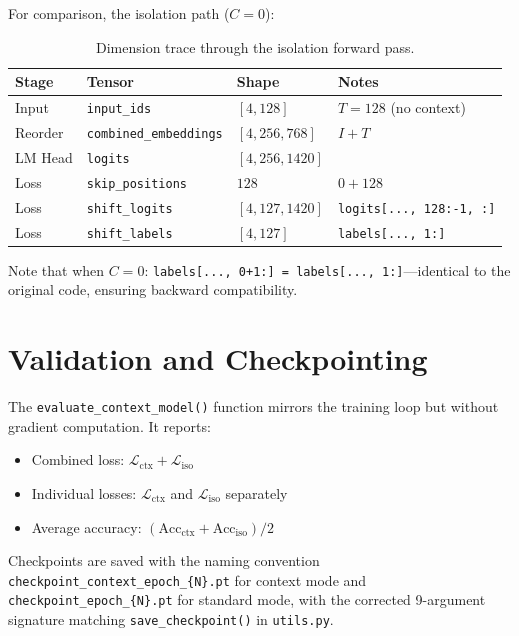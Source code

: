 \documentclass[11pt, a4paper]{report}
\begin{document}
For comparison, the isolation path ($C{=}0$):

\begin{table}[h]
\centering
\caption{Dimension trace through the isolation forward pass.}
\label{tab:dim-trace-iso}
\small
\begin{tabular}{llll}
\toprule
\textbf{Stage} & \textbf{Tensor} & \textbf{Shape} & \textbf{Notes} \\
\midrule
Input & \texttt{input\_ids} & $[4, 128]$ & $T{=}128$ (no context) \\
Reorder & \texttt{combined\_embeddings} & $[4, 256, 768]$ & $I{+}T$ \\
LM Head & \texttt{logits} & $[4, 256, 1420]$ & \\
\midrule
Loss & \texttt{skip\_positions} & $128$ & $0{+}128$ \\
Loss & \texttt{shift\_logits} & $[4, 127, 1420]$ & \texttt{logits[..., 128:-1, :]} \\
Loss & \texttt{shift\_labels} & $[4, 127]$ & \texttt{labels[..., 1:]} \\
\bottomrule
\end{tabular}
\end{table}

Note that when $C{=}0$: \texttt{labels[..., 0+1:] = labels[..., 1:]}---identical to the original code, ensuring backward compatibility.


\section{Validation and Checkpointing}
\label{sec:validation}

The \texttt{evaluate\_context\_model()} function mirrors the training loop but without gradient computation. It reports:
\begin{itemize}[leftmargin=2em]
  \item Combined loss: $\mathcal{L}_{\mathrm{ctx}} + \mathcal{L}_{\mathrm{iso}}$
  \item Individual losses: $\mathcal{L}_{\mathrm{ctx}}$ and $\mathcal{L}_{\mathrm{iso}}$ separately
  \item Average accuracy: $(\mathrm{Acc}_{\mathrm{ctx}} + \mathrm{Acc}_{\mathrm{iso}}) / 2$
\end{itemize}

Checkpoints are saved with the naming convention \texttt{checkpoint\_context\_epoch\_\{N\}.pt} for context mode and \texttt{checkpoint\_epoch\_\{N\}.pt} for standard mode, with the corrected 9-argument signature matching \texttt{save\_checkpoint()} in \texttt{utils.py}.
\end{document}
